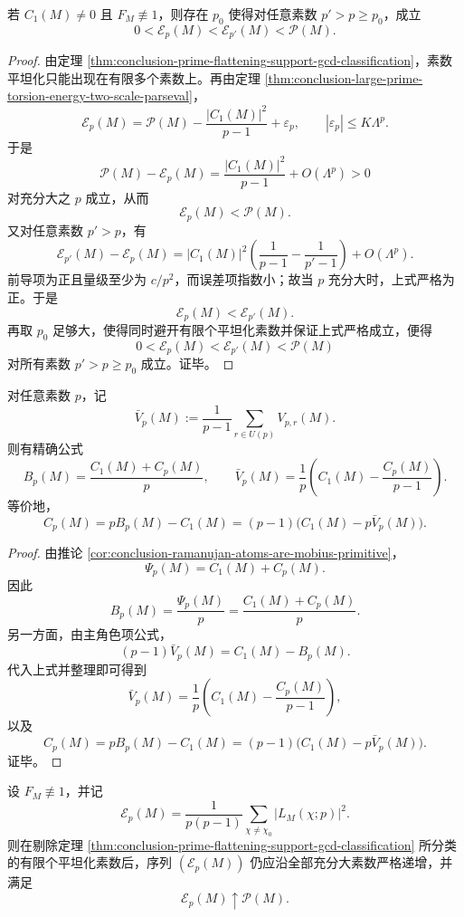 \begin{theorem}\label{thm:conclusion-large-prime-torsion-energy-eventual-monotone-from-below}
若 \(C_1(M)\neq 0\) 且 \(F_M\not\equiv 1\)，则存在 \(p_0\) 使得对任意素数 \(p'>p\ge p_0\)，成立
\[
0<\mathcal E_p(M)<\mathcal E_{p'}(M)<\mathcal P(M).
\]
\end{theorem}
\begin{proof}
由定理 \ref{thm:conclusion-prime-flattening-support-gcd-classification}，素数平坦化只能出现在有限多个素数上。再由定理 \ref{thm:conclusion-large-prime-torsion-energy-two-scale-parseval}，
\[
\mathcal E_p(M)=\mathcal P(M)-\frac{|C_1(M)|^2}{p-1}+\varepsilon_p,
\qquad
|\varepsilon_p|\le K\Lambda^p.
\]
于是
\[
\mathcal P(M)-\mathcal E_p(M)=\frac{|C_1(M)|^2}{p-1}+O(\Lambda^p)>0
\]
对充分大之 \(p\) 成立，从而
\[
\mathcal E_p(M)<\mathcal P(M).
\]
又对任意素数 \(p'>p\)，有
\[
\mathcal E_{p'}(M)-\mathcal E_p(M)
=
|C_1(M)|^2\left(\frac1{p-1}-\frac1{p'-1}\right)+O(\Lambda^p).
\]
前导项为正且量级至少为 \(c/p^2\)，而误差项指数小；故当 \(p\) 充分大时，上式严格为正。于是
\[
\mathcal E_p(M)<\mathcal E_{p'}(M).
\]
再取 \(p_0\) 足够大，使得同时避开有限个平坦化素数并保证上式严格成立，便得
\[
0<\mathcal E_p(M)<\mathcal E_{p'}(M)<\mathcal P(M)
\]
对所有素数 \(p'>p\ge p_0\) 成立。证毕。
\end{proof}

\begin{proposition}\label{prop:conclusion-prime-ramanujan-atom-multiple-axis-barycenter-gap}
对任意素数 \(p\)，记
\[
\bar V_p(M):=\frac1{p-1}\sum_{r\in U(p)}V_{p,r}(M).
\]
则有精确公式
\[
B_p(M)=\frac{C_1(M)+C_p(M)}{p},
\qquad
\bar V_p(M)=\frac1p\left(C_1(M)-\frac{C_p(M)}{p-1}\right).
\]
等价地，
\[
C_p(M)=pB_p(M)-C_1(M)=(p-1)\bigl(C_1(M)-p\bar V_p(M)\bigr).
\]
\end{proposition}
\begin{proof}
由推论 \ref{cor:conclusion-ramanujan-atoms-are-mobius-primitive}，
\[
\Psi_p(M)=C_1(M)+C_p(M).
\]
因此
\[
B_p(M)=\frac{\Psi_p(M)}{p}=\frac{C_1(M)+C_p(M)}{p}.
\]
另一方面，由主角色项公式，
\[
(p-1)\bar V_p(M)=C_1(M)-B_p(M).
\]
代入上式并整理即可得到
\[
\bar V_p(M)=\frac1p\left(C_1(M)-\frac{C_p(M)}{p-1}\right),
\]
以及
\[
C_p(M)=pB_p(M)-C_1(M)=(p-1)\bigl(C_1(M)-p\bar V_p(M)\bigr).
\]
证毕。
\end{proof}

\begin{conjecture}\label{conj:conclusion-prime-torsion-energy-monotone-critical-mainterm-zero}
设 \(F_M\not\equiv 1\)，并记
\[
\mathcal E_p(M)=\frac1{p(p-1)}\sum_{\chi\neq\chi_0}|L_M(\chi;p)|^2.
\]
则在剔除定理 \ref{thm:conclusion-prime-flattening-support-gcd-classification} 所分类的有限个平坦化素数后，序列 \((\mathcal E_p(M))\) 仍应沿全部充分大素数严格递增，并满足
\[
\mathcal E_p(M)\uparrow \mathcal P(M).
\]
\end{conjecture}
